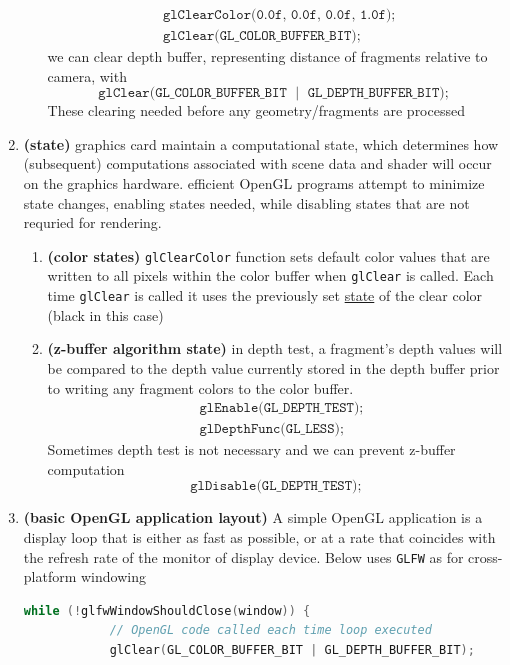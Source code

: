 \documentclass[11pt]{article}
\newcommand{\bheading}[1]{\textbf{(#1)}}
\begin{document}
\begin{enumerate}
\begin{enumerate}
\begin{align*}
            &\texttt{glClearColor(0.0f, 0.0f, 0.0f, 1.0f); } \\ 
            &\texttt{glClear(GL\_COLOR\_BUFFER\_BIT); }
        \end{align*}
        we can clear depth buffer, representing distance of fragments relative to camera, with
        \[
            \texttt{
                glClear(GL\_COLOR\_BUFFER\_BIT $\;\mid\;$ GL\_DEPTH\_BUFFER\_BIT);
            }
        \]
        These clearing needed before any geometry/fragments are processed
    \end{enumerate}
    \item \bheading{state} graphics card maintain a computational state, which determines how (subsequent) computations associated with scene data and shader will occur on the graphics hardware. efficient OpenGL programs attempt to minimize state changes, enabling states needed, while disabling states that are not requried for rendering.
    \begin{enumerate}
        \item \bheading{color states} \texttt{glClearColor} function sets default color values that are written to all pixels within the color buffer when \texttt{glClear} is called. Each time \texttt{glClear} is called it uses the previously set \underline{state} of the clear color (black in this case)
        \item \bheading{z-buffer algorithm state} in depth test, a fragment's depth values will be compared to the depth value currently stored in the depth buffer prior to writing any fragment colors to the color buffer.
        \begin{align*}
            &\texttt{glEnable(GL\_DEPTH\_TEST);} \\
            &\texttt{glDepthFunc(GL\_LESS);}  
        \end{align*}
        Sometimes depth test is not necessary and we can prevent z-buffer computation
        \[
            \texttt{glDisable(GL\_DEPTH\_TEST);}
        \]
    \end{enumerate}
    \item \bheading{basic OpenGL application layout} A simple OpenGL application is a display loop that is either as fast as possible, or at a rate that coincides with the refresh rate of the monitor of display device. Below uses \texttt{GLFW} as for cross-platform windowing
    
    \begin{lstlisting}[frame=single, language=c++]
        while (!glfwWindowShouldClose(window)) {
            // OpenGL code called each time loop executed
            glClear(GL_COLOR_BUFFER_BIT | GL_DEPTH_BUFFER_BIT);


\end{lstlisting}
\end{enumerate}
\end{document}

